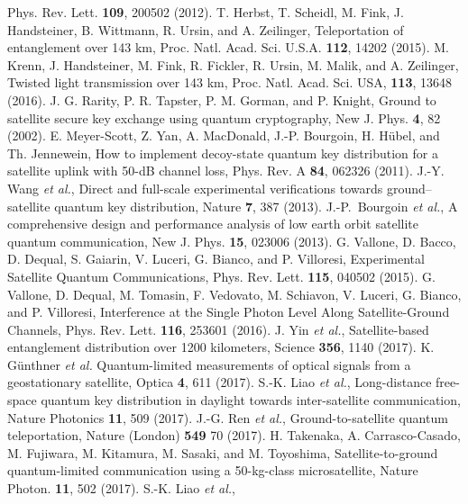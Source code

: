 \documentclass[aps,pra,twocolumn,a4paper,nofootinbib,preprintnumbers] {revtex4-1}
\begin{document}
\begin{thebibliography}{99}
	Phys. Rev. Lett. \textbf{109}, 200502 (2012).
	T. Herbst, T. Scheidl, M. Fink, J. Handsteiner, B. Wittmann, R. Ursin, and A. Zeilinger,
	Teleportation of entanglement over 143 km,
	Proc. Natl. Acad. Sci. U.S.A. \textbf{112}, 14202 (2015).
	M. Krenn, J. Handsteiner, M. Fink, R. Fickler, R. Ursin, M. Malik, and A. Zeilinger,
	Twisted light transmission over 143 km,
	Proc. Natl. Acad. Sci. USA, \textbf{113}, 13648 (2016).
	J. G. Rarity, P. R. Tapster, P. M. Gorman, and P. Knight,
	Ground to satellite secure key exchange using quantum cryptography,
	New J. Phys. \textbf{4}, 82 (2002).
	E. Meyer-Scott, Z. Yan, A. MacDonald, J.-P. Bourgoin, H. H\"ubel, and Th. Jennewein,
	How to implement decoy-state quantum key distribution for a satellite uplink with 50-dB channel loss,
	Phys. Rev. A \textbf{84}, 062326 (2011).
	J.-Y. Wang \textit{et al.},
	Direct and full-scale experimental verifications towards ground–satellite quantum key distribution,
	Nature \textbf{7}, 387 (2013).
	J.-P.~Bourgoin \textit{et al.},
	A comprehensive design and performance analysis of low earth orbit satellite quantum communication,
	New J. Phys.  \textbf{15}, 023006 (2013).
	G. Vallone, D. Bacco, D. Dequal, S. Gaiarin, V. Luceri, G. Bianco, and P. Villoresi,
	Experimental Satellite Quantum Communications,
	Phys. Rev. Lett. \textbf{115}, 040502 (2015).
	G. Vallone, D. Dequal, M. Tomasin, F. Vedovato, M. Schiavon, V. Luceri, G. Bianco, and P. Villoresi, Interference at the Single Photon Level Along Satellite-Ground Channels,
	Phys. Rev. Lett. \textbf{116}, 253601 (2016).
	J. Yin \textit{et al.},
	Satellite-based entanglement distribution over 1200 kilometers,
	Science \textbf{356}, 1140 (2017).
	K. G\"unthner \textit{et al.}
	Quantum-limited measurements of optical signals from a geostationary satellite,
	Optica \textbf{4}, 611 (2017).
	S.-K. Liao \textit{et al.},
	Long-distance free-space quantum key distribution in daylight towards inter-satellite communication,
	Nature Photonics \textbf{11}, 509 (2017).
	J.-G. Ren  \textit{et al.},
	Ground-to-satellite quantum teleportation,
	Nature (London) \textbf{549} 70 (2017).
	H. Takenaka, A. Carrasco-Casado, M. Fujiwara, M. Kitamura, M. Sasaki, and M. Toyoshima,
	Satellite-to-ground quantum-limited communication using a 50-kg-class microsatellite,
	Nature Photon. \textbf{11}, 502 (2017).
	S.-K. Liao \textit{ et al.},

\end{thebibliography}
\end{document}
